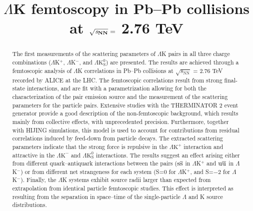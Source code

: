 \documentclass[ALICE,manyauthors]{cernphprep}
\newcommand{\LamK}{$\Lambda$K\xspace}
\newcommand{\LamKchP}{$\Lambda\mathrm{K^{+}}$\xspace}
\newcommand{\LamKchM}{$\Lambda\mathrm{K^{-}}$\xspace}
\newcommand{\LamKs}{$\Lambda\mathrm{K^{0}_{S}}$\xspace}
\begin{document}
%

\begin{titlepage}
%
%

\title{\LamK femtoscopy in Pb--Pb collisions at $\mathbf{\sqrt{{\textit s}_{NN}}} =$ 2.76 TeV}
\ShortTitle{\LamK femtoscopy in Pb--Pb collisions}   %


\begin{abstract}
The first measurements of the scattering parameters of $\Lambda$K pairs in all three charge combinations ($\Lambda$K$^{+}$, $\Lambda$K$^{-}$, and $\Lambda\mathrm{K^{0}_{S}}$) are presented.
The results are achieved through a femtoscopic analysis of $\Lambda$K correlations in Pb--Pb collisions at $\sqrt{s_{\mathrm{NN}}}$ = 2.76 TeV recorded by ALICE at the LHC.  
The femtoscopic correlations result from strong final-state interactions, and are fit with a parametrization allowing for both the characterization of the pair emission source and the measurement of the scattering parameters for the particle pairs.
Extensive studies with the THERMINATOR 2 event generator provide a good description of the non-femtoscopic background, which results mainly from collective effects, with unprecedented precision.
Furthermore, together with HIJING simulations, this model is used to account for contributions from residual correlations induced by feed-down from particle decays.
The extracted scattering parameters indicate that the strong force is repulsive in the \LamKchP interaction and attractive in the \LamKchM and \LamKs interactions.
The results suggest an effect arising either from different quark--antiquark interactions between the pairs ($\rm s\overline{s}$ in $\Lambda$K$^{+}$ and $\rm u\overline{u}$ in $\Lambda$K$^{-}$) or from different net strangeness for each system (S=0 for $\Lambda$K$^{+}$, and S=$-2$ for $\Lambda$K$^{-}$).
Finally, the $\Lambda$K systems exhibit source radii larger than expected from extrapolation from identical particle femtoscopic studies.
This effect is interpreted as resulting from the separation in space--time of the single-particle $\Lambda$ and K source distributions.
\end{abstract}
\end{titlepage}
\setcounter{page}{2}
\end{document}
